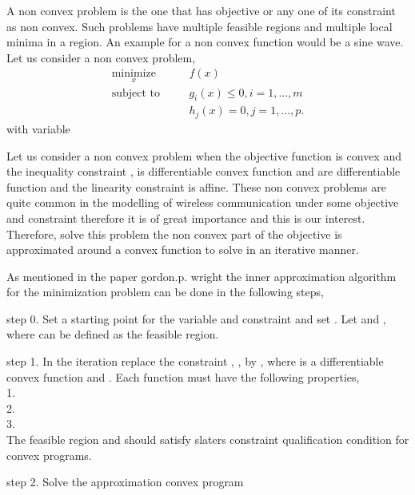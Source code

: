 A non convex problem is the one that has objective or any one of its constraint as non convex. Such problems have multiple feasible regions and multiple local minima in a region. An example for a non convex function would be a sine wave. Let us consider a non convex problem,
\begin{eqnarray}
\underset{x}{\text{minimize}} \quad && f(x) \\
\text{subject to} \quad && g_i(x) \leq 0, i = 1,\dotsc,m\\
&& h_j(x) = 0, j = 1,\dotsc,p.
\end{eqnarray} 
with variable 
\par
Let us consider a non convex problem when the objective function  is convex and the inequality constraint ,   is differentiable convex function and    are differentiable function and the linearity constraint is affine. These non convex problems are quite common in the modelling of wireless communication under some objective and constraint therefore it is of great importance and this is our interest. Therefore, solve this problem the non convex part of the objective is approximated around a convex function to solve in an iterative manner. 
\par
As mentioned in the paper gordon.p. wright the inner approximation algorithm for the minimization problem can be done in the following steps,\\
\par
step 0. Set a starting point for the variable and constraint  and set . Let  and , where  can be defined as the feasible region.\\
\par
step 1. In the  iteration replace the constraint , , by , where  is a differentiable convex function and . Each function  must  have the following properties,\\
1. \\
2. \\
3. \\
The feasible region  and  should satisfy slaters constraint qualification condition for convex programs.\\
\par
step 2. Solve the approximation convex program\\

